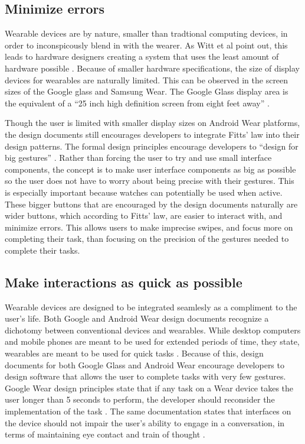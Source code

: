 \documentclass[12pt]{article}
\begin{document}
\subsection{Minimize errors}
Wearable devices are by nature, smaller than tradtional computing devices, in order to inconspicously blend in with the wearer. As Witt et al point out, this leads to hardware designers creating a system that uses the least amount of hardware possible \cite{witt}. Because of smaller hardware specifications, the size of display devices for wearables are naturally limited. This can be observed in the screen sizes of the Google glass and Samsung Wear. The Google Glass display area is the equivalent of a ``25 inch high definition screen from eight feet away'' \cite{goog2}.

Though the user is limited with smaller display sizes on Android Wear platforms, the design documents still encourages developers to integrate Fitts' law into their design patterns. The formal design principles encourage developers to ``design for big gestures'' \cite{andr}. Rather than forcing the user to try and use small interface components, the concept is to make user interface components as big as possible so the user does not have to worry about being precise with their gestures. This is especially important because watches can potentially be used when active. These bigger buttons that are encouraged by the design documents naturally are wider buttons, which according to Fitts' law, are easier to interact with, and minimize errors. This allows users to make imprecise swipes, and focus more on completing their task, than focusing on the precision of the gestures needed to complete their tasks.

\subsection{Make interactions as quick as possible}
Wearable devices are designed to be integrated seamlesly as a compliment to the user's life. Both Google and Android Wear design documents recognize a dichotomy between conventional devices and wearables. While desktop computers and mobile phones are meant to be used for extended periods of time, they state, wearables are meant to be used for quick tasks \cite{andr} \cite{goog}. Because of this, design documents for both Google Glass and Android Wear encourage developers to design software that allows the user to complete tasks with very few gestures. Google Wear design principles state that if any task on a Wear device takes the user longer than 5 seconds to perform, the developer should reconsider the implementation of the task \cite{andr}. The same documentation states that interfaces on the device should not impair the user's ability to engage in a conversation, in terms of maintaining eye contact and train of thought \cite{andr}.
\end{document}
